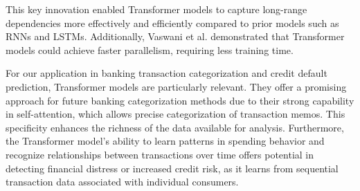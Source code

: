 \documentclass[12pt,letterpaper]{article}
\begin{document}
This key innovation enabled Transformer models to capture long-range dependencies more effectively and efficiently compared to prior models such as RNNs and LSTMs. Additionally, Vaswani et al. demonstrated that Transformer models could achieve faster parallelism, requiring less training time.

For our application in banking transaction categorization and credit default prediction, Transformer models are particularly relevant. They offer a promising approach for future banking categorization methods due to their strong capability in self-attention, which allows precise categorization of transaction memos. This specificity enhances the richness of the data available for analysis. Furthermore, the Transformer model's ability to learn patterns in spending behavior and recognize relationships between transactions over time offers potential in detecting financial distress or increased credit risk, as it learns from sequential transaction data associated with individual consumers.



\end{document}
